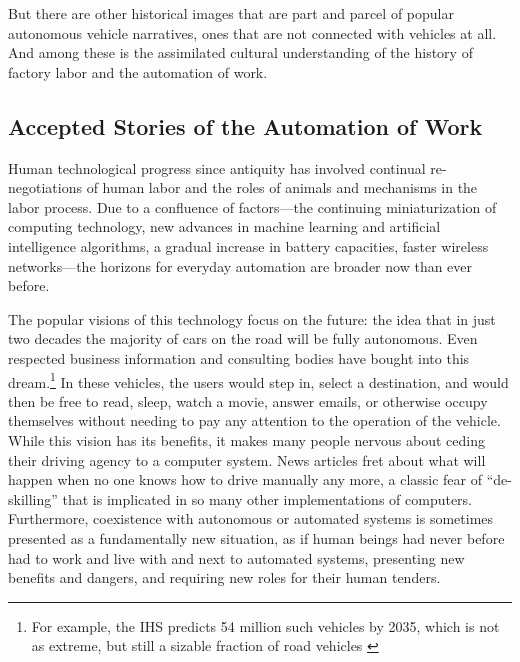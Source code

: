 But there are other historical images that are part and parcel of
popular autonomous vehicle narratives, ones that are not connected
with vehicles at all. And among these is the assimilated cultural
understanding of the history of factory labor and the automation of work.

\subsection{Accepted Stories of the Automation of Work}

Human technological progress since antiquity has
involved continual re-negotiations of human labor and the roles of
animals and mechanisms in the labor process. Due to a confluence
of factors---the continuing miniaturization of computing technology, new
advances in machine learning and artificial intelligence algorithms, a
gradual increase in battery capacities, faster wireless networks---the
horizons for everyday automation are broader now than ever before. 

The popular visions of this technology focus on the future: the
idea that in just two decades the majority of cars on the road will be
fully autonomous. Even respected business information and consulting
bodies have bought into this dream.\footnote{For example, the IHS
  predicts 54 million such vehicles by 2035, which is not as extreme,
  but still a sizable fraction of road vehicles \cite{IHSstudy}} In these vehicles, the users would
step in, select a destination, and would then be free to read, sleep,
watch a movie, answer emails, or otherwise occupy themselves without
needing to pay any attention to the operation of the vehicle. While this
vision has its benefits, it makes many people nervous about
ceding their driving agency to a computer system.\cite{clytton} News articles fret
about what will happen when no one knows how to drive manually any
more,\cite{pross} a classic fear of ``de-skilling'' that is implicated in so many
other implementations of computers. Furthermore, coexistence with
autonomous or automated systems is sometimes presented as a fundamentally new
situation, as if human beings had never before had to work and live
with and next to automated systems, presenting new benefits and
dangers, and requiring new roles for their human tenders.

